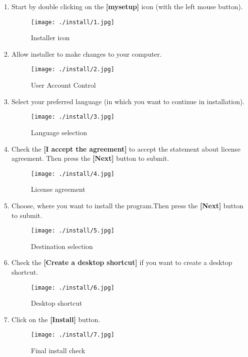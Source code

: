 \documentclass{article}
\begin{document}
\begin{enumerate}
\item Start by double clicking on the \textbf{[mysetup]} icon (with the left mouse button).
  \begin{figure}[H]
    \centering
    \texttt{[image: ./install/1.jpg]}
    \caption{Installer icon}
  \end{figure}
  
  
\item Allow installer to make changes to your computer.
  \begin{figure}[H]
    \centering
    \texttt{[image: ./install/2.jpg]}
    \caption{User Account Control}
  \end{figure}
  

\item Select your preferred language (in which you want to continue in installation).
\begin{figure}[H]
    \centering
    \texttt{[image: ./install/3.jpg]}
    \caption{Language selection}
  \end{figure}


\item Check the \textbf{[I accept the agreement]} to accept the statement about license agreement. Then press the \textbf{[Next]} button to submit.
\begin{figure}[H]
    \centering
    \texttt{[image: ./install/4.jpg]}
    \caption{License agreement}
  \end{figure}
  

\item Choose, where you want to install the program.Then press the \textbf{[Next]} button to submit.
\begin{figure}[H]
    \centering
    \texttt{[image: ./install/5.jpg]}
    \caption{Destination selection}
  \end{figure}
  
\newpage

\item Check the \textbf{[Create a desktop shortcut]} if you want to create a desktop shortcut.
\begin{figure}[H]
    \centering
    \texttt{[image: ./install/6.jpg]}
    \caption{Desktop shortcut}
  \end{figure}


\item Click on the \textbf{[Install]} button.
\begin{figure}[H]
    \centering
    \texttt{[image: ./install/7.jpg]}
    \caption{Final install check}
  \end{figure}


\end{enumerate}
\end{document}

